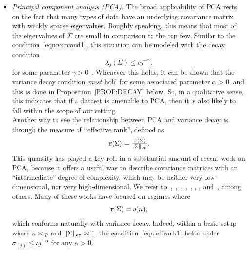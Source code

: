 \documentclass[aos,preprint]{imsart}
\numberwithin{equation}{section}
\theoremstyle{plain}
\newcommand{\tr}{\operatorname{tr}}
\newcommand{\op}{_{\textup{op}}}
\newcommand{\ts}{\textstyle}
\newcommand{\1}{{\bf{1}}}
\newcommand{\0}{\mathbf{0}}
\begin{document}
\begin{itemize}
\item \emph{Principal component analysis (PCA).} The broad applicability of PCA rests on the fact that many types of data have an underlying covariance matrix with weakly sparse eigenvalues. Roughly speaking, this means that most of the eigenvalues of $\Sigma$ are small in comparison to the top few. Similar to the condition~\eqref{eqn:varcond1}, this situation can be modeled with the decay condition
\begin{equation}\label{eqn:eigdecay}
\lambda_j(\Sigma) \leq c j^{-\gamma},
\end{equation}
for some parameter $\gamma>0$~\cite[e.g.][]{Bunea:Xiao:2015}. Whenever this holds, it can be shown that the variance decay condition \emph{must} hold for some associated parameter $\alpha>0$, and this is done in Proposition~\ref{PROP:DECAY} below. So, in a qualitative sense, this indicates that if a dataset is amenable to PCA, then it is also likely to fall within the scope of our setting.\\

Another way to see the relationship between PCA and variance decay is through the measure of ``effective rank'', defined as
\begin{equation}
{\tt{r}}(\Sigma)=\ts\frac{\tr(\Sigma)}{\|\Sigma\|_{\text{op}}}.
\end{equation}
This quantity has played a key role in a substantial amount of recent work on PCA, because it offers a useful way to describe covariance matrices with an ``intermediate'' degree of complexity, which may be neither very low-dimensional, nor very high-dimensional. We refer to~\cite{Vershynin:2012},~\cite{Lounici:2014},~\cite{Bunea:Xiao:2015}, \cite{Reiss:2016},~\cite{Koltchinskii:Bernoulli:2017,Koltchinskii:2017}, \cite{Nickl:2017}, \cite{Naumov:2017}, and~\cite{Jung:2018}, among others.
Many of these works have focused on regimes where
\begin{equation}\label{eqn:effrank1}
{\tt{r}}(\Sigma)=o(n),
\end{equation}
which conforms naturally with variance decay. Indeed, within a basic setup where $n\asymp p$ and $\|\Sigma\|\op\asymp 1$, the condition~\eqref{eqn:effrank1} holds under $\sigma_{(j)}\leq cj^{-\alpha}$ for any $\alpha>0$.\\[0.2cm]


\end{itemize}
\end{document}
